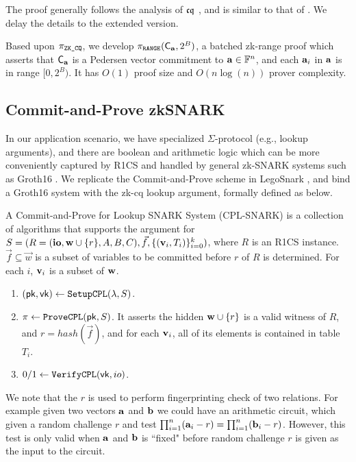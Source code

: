 The proof generally follows the analysis of 
${\mathfrak{cq}}$ \cite{cq}, and is similar to that of 
\cite{CCG23,MatrixLookup}. We delay the details 
to the extended version.

Based upon $\pi_\texttt{ZK\_CQ}$,
we develop $\pi_\texttt{RANGE}({\mathsf{C}}_{{{\mathbf {a}}}}, 2^B)$,
a batched zk-range proof which asserts 
that ${\mathsf{C}}_{{{\mathbf {a}}}}$ is
a Pedersen vector commitment to ${{\mathbf {a}}} \in \mathbb{F}^n$,
and each ${{\mathbf {a}}}_i$ in 
${{\mathbf {a}}}$ is in range $[0, 2^B)$. 
It has $O(1)$ proof size and $O(n\log(n))$
 prover complexity.


\subsection{Commit-and-Prove zkSNARK}
In our application scenario, we have specialized $\Sigma$-protocol
(e.g., lookup arguments), and there are boolean and arithmetic
logic which can be more conveniently captured by R1CS and handled
by general zk-SNARK systems such as Groth16 \cite{Groth16}.
We replicate the Commit-and-Prove scheme in LegoSnark \cite{LegoSnarkFull},
and bind a Groth16 system with the zk-cq lookup argument, 
formally defined as below.

\begin{definition}  A Commit-and-Prove for Lookup SNARK System (CPL-SNARK)
is a collection of algorithms that supports the argument for
$S = (R=({{\mathbf {io}}},{{\mathbf {w}}} \cup \{r\},A,B,C), \vec{f}, 
\{({{\mathbf {v}}}_i, T_i)\}_{i=0}^k)$, 
where $R$ is an R1CS instance. 
$\vec{f} \subseteq \vec{w}$ is a subset of variables to be
committed before $r$ of $R$ is determined.
For each $i$, ${{\mathbf {v}}}_i$ is a subset of ${{\mathbf {w}}}$.
\begin{enumerate}
 \item $(\mathsf{pk}, \mathsf{vk}) \leftarrow \texttt{SetupCPL}(\lambda, S)$.
 \item $\pi \leftarrow \texttt{ProveCPL}(\mathsf{pk}, S)$. It asserts the
 hidden ${{\mathbf {w}}} \cup \{r\}$ is a valid witness of
 $R$, and $r = hash(\vec{f})$, and
 for each ${{\mathbf {v}}}_i$, all of its elements
 is contained in table $T_i$.
 \item $0/1 \leftarrow \texttt{VerifyCPL}(\mathsf{vk}, io)$.
\end{enumerate}
\end{definition}

We note that the $r$ is used to perform fingerprinting check
of two relations. For example given two vectors ${{\mathbf {a}}}$
and ${{\mathbf {b}}}$ we could have an arithmetic circuit, which given
a random challenge $r$ and test $\prod_{i=1}^{n} ({{\mathbf {a}}}_i-r) 
= \prod_{i=1}^n ({{\mathbf {b}}}_i-r)$. However, this test is only
valid when ${{\mathbf {a}}}$ and ${{\mathbf {b}}}$ is ``fixed" before
random challenge $r$ is given as the input to the circuit.


